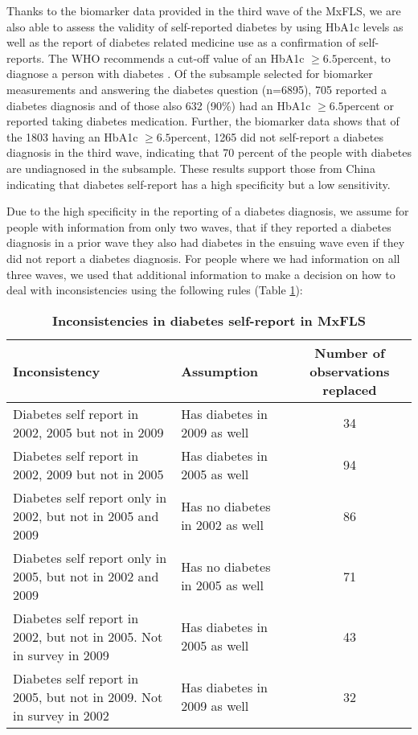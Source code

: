 Thanks to the biomarker data provided in the third wave of the \ac{MxFLS},
we are also able to assess the validity of self-reported diabetes
by using \ac{HbA1c} levels as well as the report of diabetes related
medicine use as a confirmation of self-reports. The \ac{WHO} recommends
a cut-off value of an \ac{HbA1c} $\geq6.5$percent, to diagnose
a person with diabetes \citep{WorldHealthOrganization2011}. Of the
subsample selected for biomarker measurements and answering the diabetes
question (n=6895), 705 reported a diabetes diagnosis and of those
also 632 (90\%) had an \ac{HbA1c} $\geq6.5$percent or reported
taking diabetes medication. Further, the biomarker data shows that
of the 1803 having an \ac{HbA1c} $\geq6.5$percent, 1265 did
not self-report a diabetes diagnosis in the third wave, indicating
that 70 percent of the people with diabetes are undiagnosed in the
subsample. These results support those from China indicating that
diabetes self-report has a high specificity but a low sensitivity.

Due to the high specificity in the reporting of a diabetes diagnosis,
we assume for people with information from only two waves, that if
they reported a diabetes diagnosis in a prior wave they also had diabetes
in the ensuing wave even if they did not report a diabetes diagnosis.
For people where we had information on all three waves, we used that
additional information to make a decision on how to deal with inconsistencies
using the following rules (Table \ref{tab:Inconsistencies}):

\begin{table}[h!]
\begin{center}
\begin{tabular}{llc}
Inconsistency & Assumption & Number of observations replaced\tabularnewline
\hline 
Diabetes self report in 2002, 2005 but not in 2009 & Has diabetes in 2009 as well & 34\tabularnewline
Diabetes self report in 2002, 2009 but not in 2005 & Has diabetes in 2005 as well & 94\tabularnewline
Diabetes self report only in 2002, but not in 2005 and 2009 & Has no diabetes in 2002 as well & 86\tabularnewline
Diabetes self report only in 2005, but not in 2002 and 2009 & Has no diabetes in 2005 as well & 71\tabularnewline
Diabetes self report in 2002, but not in 2005. Not in survey in 2009 & Has diabetes in 2005 as well & 43\tabularnewline
Diabetes self report in 2005, but not in 2009. Not in survey in 2002 & Has diabetes in 2009 as well & 32\tabularnewline
\hline 
\end{tabular}
\end{center}
\caption{\label{tab:Inconsistencies}\textbf{Inconsistencies in diabetes self-report in MxFLS}}
\end{table}
  

